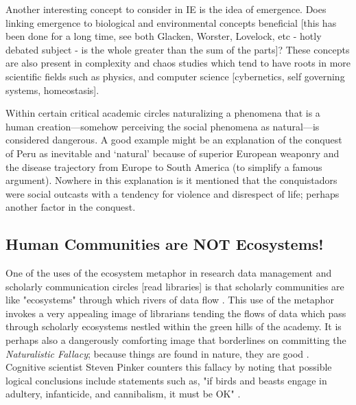 Another interesting concept to consider in IE is the idea of emergence. Does linking emergence to biological and environmental concepts beneficial [this has been done for a long time, see both Glacken, Worster, Lovelock, etc - hotly debated subject - is the whole greater than the sum of the parts]? These concepts are also present in complexity and chaos studies which tend to have roots in more scientific fields such as physics, and computer science [cybernetics, self governing systems, homeostasis].

Within certain critical academic circles naturalizing a phenomena that is a human creation—somehow perceiving the social phenomena as natural—is considered dangerous. A good example might be an explanation of the conquest of Peru as inevitable and ‘natural’ because of superior European weaponry and the disease trajectory from Europe to South America (to simplify a famous argument). Nowhere in this explanation is it mentioned that the conquistadors were social outcasts with a tendency for violence and disrespect of life; perhaps another factor in the conquest. 

\subsection{Human Communities are NOT Ecosystems!}

One of the uses of the ecosystem metaphor in research data management and scholarly communication circles [read libraries] is that scholarly communities are like "ecosystems" through which rivers of data flow \citep{choudhury_2010}. This use of the metaphor invokes a very appealing image of librarians tending the flows of data which pass through scholarly ecosystems nestled within the green hills of the academy. It is perhaps also a dangerously comforting image that borderlines on committing the \textit{Naturalistic Fallacy}; because things are found in nature, they are good \citep[see][p. 68 for a similar example in business]{lucas_2012}. Cognitive scientist Steven Pinker counters this fallacy by noting that possible logical conclusions include statements such as, "if birds and beasts engage in adultery, infanticide, and cannibalism, it must be OK" \citep{pinker_2002}. 

